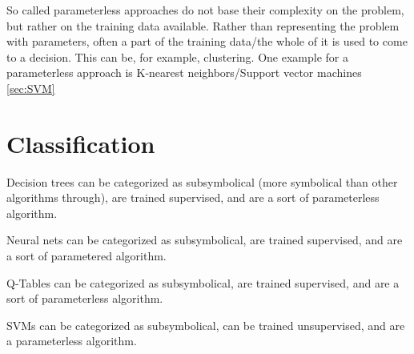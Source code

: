 So called parameterless approaches do not base their complexity on the problem, but rather on the training data available. Rather than representing the problem with parameters, often a part of the training data/the whole of it is used to come to a decision. This can be, for example, clustering.
One example for a parameterless approach is K-nearest neighbors/Support vector machines \autoref{sec:SVM}

\section{Classification}
Decision trees can be categorized as subsymbolical (more symbolical than other algorithms through), are trained supervised, and are a sort of parameterless algorithm.

Neural nets can be categorized as subsymbolical, are trained supervised, and are a sort of parametered algorithm.

Q-Tables can be categorized as subsymbolical, are trained supervised, and are a sort of parameterless algorithm.

SVMs can be categorized as subsymbolical, can be trained unsupervised, and are a parameterless algorithm.







